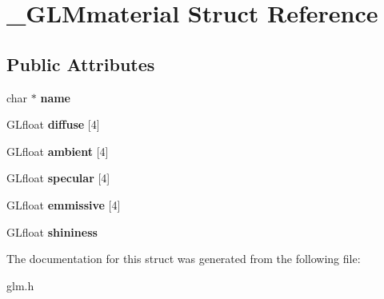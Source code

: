 \hypertarget{struct__GLMmaterial}{\section{\-\_\-\-G\-L\-Mmaterial \-Struct \-Reference}
\label{struct__GLMmaterial}
}
\subsection*{\-Public \-Attributes}
\begin{DoxyCompactItemize}
\item 
\hypertarget{struct__GLMmaterial_a5aabee911354d036897d176132348601}{char $\ast$ {\bfseries name}}\label{struct__GLMmaterial_a5aabee911354d036897d176132348601}

\item 
\hypertarget{struct__GLMmaterial_a4602d91041b40f1f95f426ee5d71fc89}{\-G\-Lfloat {\bfseries diffuse} \mbox{[}4\mbox{]}}\label{struct__GLMmaterial_a4602d91041b40f1f95f426ee5d71fc89}

\item 
\hypertarget{struct__GLMmaterial_a5009f171fe38cc6da03b637efa1fb116}{\-G\-Lfloat {\bfseries ambient} \mbox{[}4\mbox{]}}\label{struct__GLMmaterial_a5009f171fe38cc6da03b637efa1fb116}

\item 
\hypertarget{struct__GLMmaterial_a8a7847baa3892039f974d5bf4aa993be}{\-G\-Lfloat {\bfseries specular} \mbox{[}4\mbox{]}}\label{struct__GLMmaterial_a8a7847baa3892039f974d5bf4aa993be}

\item 
\hypertarget{struct__GLMmaterial_af105c3b731c0f2fe8230d6667455e18b}{\-G\-Lfloat {\bfseries emmissive} \mbox{[}4\mbox{]}}\label{struct__GLMmaterial_af105c3b731c0f2fe8230d6667455e18b}

\item 
\hypertarget{struct__GLMmaterial_a42623b39a8c3a06131750bca1cd83347}{\-G\-Lfloat {\bfseries shininess}}\label{struct__GLMmaterial_a42623b39a8c3a06131750bca1cd83347}

\end{DoxyCompactItemize}


\-The documentation for this struct was generated from the following file\-:\begin{DoxyCompactItemize}
\item 
glm.\-h\end{DoxyCompactItemize}
